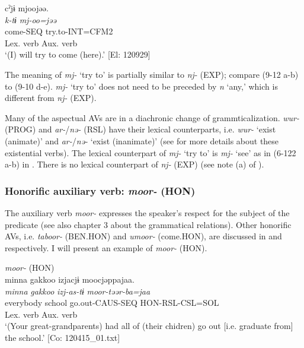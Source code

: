 \ex \label{ex:9.12b} %
     \gllll  cˀjɨ  mjoojəə.\\
      \textit{k-tɨ}  \textit{mj{}-oo=jəə}\\
      come-SEQ  try.to-INT=CFM2\\
      {Lex. verb}  {Aux. verb}\\
      \glt       ‘(I) will try to come (here).’ [El: 120929]
     \z
\z

The meaning of \textit{mj-} ‘try to’ is partially similar to \textit{nj-} (EXP); compare (9-12 a-b) to (9-10 d-e). \textit{mj-} ‘try to’ does not need to be preceded by \textit{n} ‘any,’ which is different from \textit{nj-} (EXP).

  Many of the aspectual AVs are in a diachronic change of grammticalization. \textit{wur-} (PROG) and \textit{ar-}/\textit{nə-} (RSL) have their lexical counterparts, i.e. \textit{wur-} ‘exist (animate)’ and \textit{ar-}/\textit{nə-} ‘exist (inanimate)’ (see  for more details about these existential verbs). The lexical counterpart of \textit{mj-} ‘try to’ is \textit{mj-} ‘see’ as in (6-122 a-b) in . There is no lexical counterpart of \textit{nj-} (EXP) (see note (a) of ).

\subsubsection{Honorific auxiliary verb: \textit{moor-} (HON)}\label{sec:9.1.1.2}

The auxiliary verb \textit{moor-} expresses the speaker’s respect for the subject of the predicate (see also chapter 3 about the grammatical relations). Other honorific AVs, i.e. \textit{taboor-} (BEN.HON) and \textit{umoor-} (come.HON), are discussed in  and  respectively. I will present an example of \textit{moor-} (HON).

\ea   \textit{moor-} (HON) \label{ex:9.13}\\
 \gllll  minna  {\textbar}gakkoo{\textbar}  izjacjɨ  moocjəppajaa.\\
    \textit{minna}  \textit{gakkoo}  \textit{izj-as-tɨ}  \textit{moor{}-təər-ba=jaa}\\
    everybody  school  go.out-CAUS-SEQ  HON-RSL-CSL=SOL\\
        Lex. verb  Aux. verb\\
    \glt     ‘(Your great-grandparents) had all of (their chidren) go out [i.e. graduate from] the school.’ [Co: 120415\_01.txt]
\z


